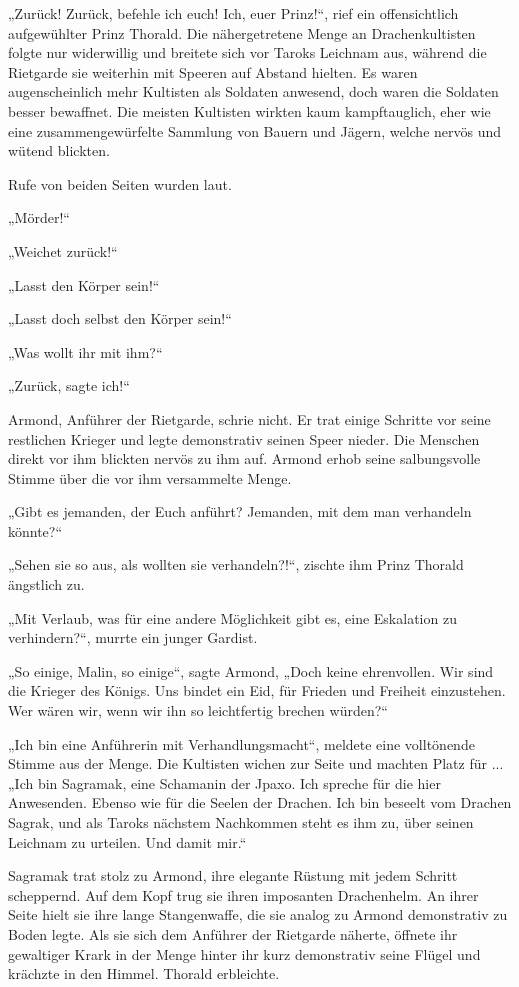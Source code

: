„Zurück! Zurück, befehle ich euch! Ich, euer Prinz!“, rief ein offensichtlich aufgewühlter Prinz Thorald. Die nähergetretene Menge an Drachenkultisten folgte nur widerwillig und breitete sich vor Taroks Leichnam aus, während die Rietgarde sie weiterhin mit Speeren auf Abstand hielten. Es waren augenscheinlich mehr Kultisten als Soldaten anwesend, doch waren die Soldaten besser bewaffnet. Die meisten Kultisten wirkten kaum kampftauglich, eher wie eine zusammengewürfelte Sammlung von Bauern und Jägern, welche nervös und wütend blickten.

Rufe von beiden Seiten wurden laut.

„Mörder!“

„Weichet zurück!“

„Lasst den Körper sein!“

„Lasst doch selbst den Körper sein!“

„Was wollt ihr mit ihm?“

„Zurück, sagte ich!“

Armond, Anführer der Rietgarde, schrie nicht. Er trat einige Schritte vor seine restlichen Krieger und legte demonstrativ seinen Speer nieder. Die Menschen direkt vor ihm blickten nervös zu ihm auf. Armond erhob seine salbungsvolle Stimme über die vor ihm versammelte Menge.

„Gibt es jemanden, der Euch anführt? Jemanden, mit dem man verhandeln könnte?“

„Sehen sie so aus, als wollten sie verhandeln?!“, zischte ihm Prinz Thorald ängstlich zu.

„Mit Verlaub, was für eine andere Möglichkeit gibt es, eine Eskalation zu verhindern?“, murrte ein junger Gardist.

„So einige, Malin, so einige“, sagte Armond, „Doch keine ehrenvollen. Wir sind die Krieger des Königs. Uns bindet ein Eid, für Frieden und Freiheit einzustehen. Wer wären wir, wenn wir ihn so leichtfertig brechen würden?“

„Ich bin eine Anführerin mit Verhandlungsmacht“, meldete eine volltönende Stimme aus der Menge. Die Kultisten wichen zur Seite und machten Platz für ... „Ich bin Sagramak, eine Schamanin der Jpaxo. Ich spreche für die hier Anwesenden. Ebenso wie für die Seelen der Drachen. Ich bin beseelt vom Drachen Sagrak, und als Taroks nächstem Nachkommen steht es ihm zu, über seinen Leichnam zu urteilen. Und damit mir.“

Sagramak trat stolz zu Armond, ihre elegante Rüstung mit jedem Schritt scheppernd. Auf dem Kopf trug sie ihren imposanten Drachenhelm. An ihrer Seite hielt sie ihre lange Stangenwaffe, die sie analog zu Armond demonstrativ zu Boden legte. Als sie sich dem Anführer der Rietgarde näherte, öffnete ihr gewaltiger Krark in der Menge hinter ihr kurz demonstrativ seine Flügel und krächzte in den Himmel. Thorald erbleichte.

